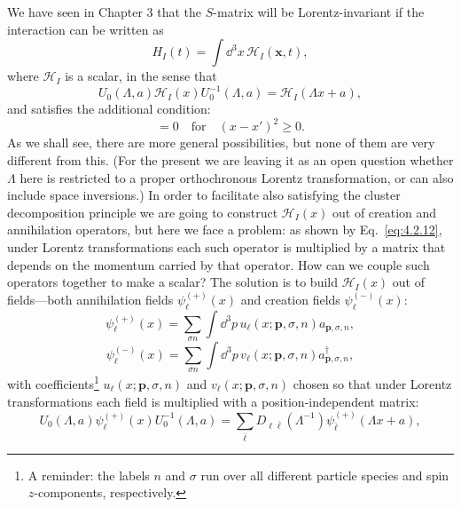 We have seen in Chapter 3 that the $S$-matrix will be Lorentz-invariant if
the interaction can be written as
\begin{equation}
  H_I(t)=\int \dd^3x\,\mathcal{H}_I(\mathbf{x},t),
  \tag{5.1.1}\label{eq:5.1.1}
\end{equation}
where $\mathcal{H}_I$ is a scalar, in the sense that
\begin{equation}
  U_0(\Lambda,a)\mathcal{H}_I(x)U_0^{-1}(\Lambda,a)
  =\mathcal{H}_I(\Lambda x+a),
  \tag{5.1.2}\label{eq:5.1.2}
\end{equation}
and satisfies the additional condition:
\begin{equation}
  [\mathcal{H}_I(x),\mathcal{H}_I(x')]=0
  \quad\text{for}\quad (x-x')^2\geq0.
  \tag{5.1.3}\label{eq:5.1.3}
\end{equation}
As we shall see, there are more general possibilities, but none of them
are very different from this. (For the present we are leaving it as an open
question whether $\Lambda$ here is restricted to a proper orthochronous Lorentz
transformation, or can also include space inversions.) In order to facilitate
also satisfying the cluster decomposition principle we are going to construct
$\mathcal{H}_I(x)$ out of creation and annihilation operators, but here we face
a problem: as shown by Eq.~\eqref{eq:4.2.12}, under Lorentz transformations each
such operator is multiplied by a matrix that depends on the momentum
carried by that operator. How can we couple such operators together
to make a scalar? The solution is to build $\mathcal{H}_I(x)$ out of fields---both
annihilation fields $\psi^{(+)}_\ell(x)$ and creation fields $\psi^{(-)}_\ell(x)$:
\begin{equation}
  \psi^{(+)}_\ell(x)=\sum_{\sigma n}\int \dd^3p\,
  u_\ell(x;\mathbf{p},\sigma,n)a_{\mathbf{p},\sigma,n},
  \tag{5.1.4}\label{eq:5.1.4}
\end{equation}
\begin{equation}
  \psi^{(-)}_\ell(x)=\sum_{\sigma n}\int \dd^3p\,
  v_\ell(x;\mathbf{p},\sigma,n)a^\dagger_{\mathbf{p},\sigma,n},
  \tag{5.1.5}\label{eq:5.1.5}
\end{equation}
with coefficients\footnote{A reminder: the labels $n$ and $\sigma$ run over all
different particle species and spin $z$-components, respectively.}
$u_\ell(x;\mathbf{p},\sigma,n)$ and $v_\ell(x;\mathbf{p},\sigma,n)$ chosen so that
under Lorentz transformations each field is multiplied with a
position-independent matrix:
\begin{equation}
  U_0(\Lambda,a)\psi^{(+)}_\ell(x)U_0^{-1}(\Lambda,a)
  =\sum_{\bar\ell}D_{\ell\bar\ell}(\Lambda^{-1})
  \psi^{(+)}_{\bar\ell}(\Lambda x+a),
  \tag{5.1.6}\label{eq:5.1.6}
\end{equation}
